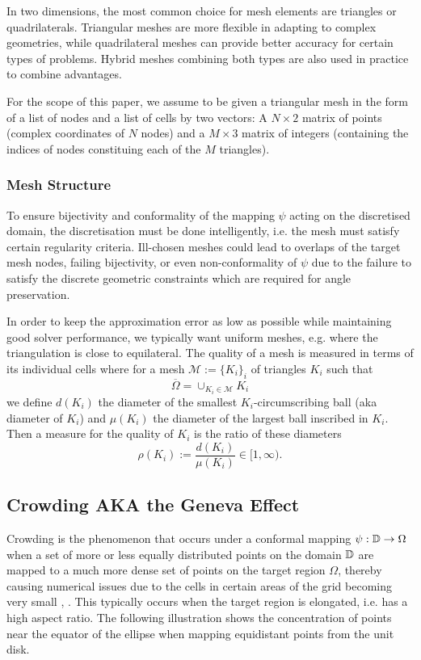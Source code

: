 In two dimensions, the most common choice for mesh elements are triangles or quadrilaterals. Triangular meshes are more flexible in adapting to complex geometries, while quadrilateral meshes can provide better accuracy for certain types of problems. Hybrid meshes combining both types are also used in practice to combine advantages.

For the scope of this paper, we assume to be given a triangular mesh in the form of a list of nodes and a list of cells by two vectors:
A $N\times2$ matrix of points (complex coordinates of $N$ nodes) and a $M\times 3$ matrix of integers (containing the indices of nodes constituing each of the $M$ triangles).

\subsubsection{Mesh Structure}\label{chap:meshStructure}
To ensure bijectivity and conformality of the mapping $\psi$ acting on the discretised domain, the discretisation must be done intelligently, i.e. the mesh must satisfy certain regularity criteria. Ill-chosen meshes could lead to overlaps of the target mesh nodes, failing bijectivity, or even non-conformality of $\psi$ due to the failure to satisfy the discrete geometric constraints which are required for angle preservation.

In order to keep the approximation error as low as possible while maintaining good solver performance, we typically want uniform meshes, e.g. where the triangulation is close to equilateral. The quality of a mesh is measured in terms of its individual cells \cite[§4.1]{Wechsung2019_shapeopt_robustsolvers_incompressible} where for a mesh $\mathcal{M}:= \{K_i\}_i$ of triangles $K_i$ such that 
\begin{equation}
 \overline{\Omega}= \displaystyle\cup_{K_i\in\mathcal{M}}K_i
\end{equation} 
we define $d(K_i)$ the diameter of the smallest $K_i$-circumscribing ball (aka diameter of $K_i$) and $\mu(K_i)$ the diameter of the largest ball inscribed in $K_i$. Then a measure for the quality of $K_i$ is the ratio of these diameters
\begin{equation}
    \rho(K_i) := \frac{d(K_i)}{\mu(K_i)} \in [1,\infty).
\end{equation}


\subsection{Crowding AKA the Geneva Effect}
Crowding is the phenomenon that occurs under a conformal mapping $\psi:\mathbb{D}\to\Omega$ when a set of more or less equally distributed points on the domain $\mathbb{D}$ are mapped to a much more dense set of points on the target region $\Omega$, thereby causing numerical issues due to the cells in certain areas of the grid becoming very small \cite[page 428]{Henrici1986_vol3}, \cite{Banjai2008_SC_crowdingworkaround}. This typically occurs when the target region is elongated, i.e. has a high aspect ratio. The following illustration shows the concentration of points near the equator of the ellipse when mapping equidistant points from the unit disk.


